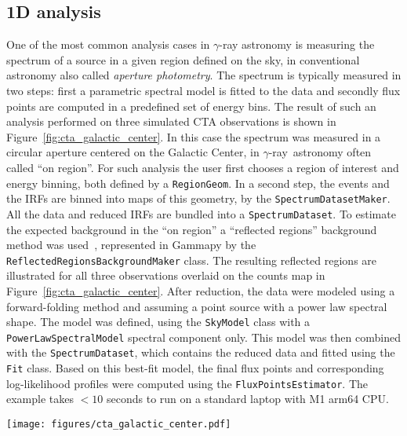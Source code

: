 \documentclass[longauth]{aa}
\newcommand{\code}[1]{\texttt{#1}}
\newcommand{\gammapy}{Gammapy\xspace}
\newcommand{\gammaray}{$\gamma$-ray\xspace}
\begin{document}
\subsection{1D analysis}
\label{ssec:1d-analysis}
One of the most common analysis cases in \gammaray astronomy is measuring the
spectrum of a source in a given region defined on the sky, in conventional
astronomy also called \emph{aperture photometry}. The spectrum is typically measured
in two steps: first a parametric spectral model is fitted to the data and
secondly flux points are computed in a predefined set of energy bins. The
result of such an analysis performed on three simulated CTA observations is
shown in Figure~\ref{fig:cta_galactic_center}. In this case the spectrum was
measured in a circular aperture centered on the Galactic Center, in
\gammaray~astronomy often called \enquote{on region}. For such analysis the user first
chooses a region of interest and energy binning, both defined by a
\code{RegionGeom}. In a second step, the events and the IRFs are binned
into maps of this geometry, by the \code{SpectrumDatasetMaker}. All the data and
reduced IRFs are bundled into a \code{SpectrumDataset}. To estimate
the expected background in the \enquote{on region} a \enquote{reflected regions} background
method was used~\citep{Berge07}, represented in \gammapy by the
\code{ReflectedRegionsBackgroundMaker} class. The resulting reflected regions are
illustrated for all three observations overlaid on the counts map in Figure~\ref{fig:cta_galactic_center}.
After reduction, the data were modeled using a forward-folding method and assuming
a point source with a power law spectral shape. The model was defined, using
the \code{SkyModel} class with a \code{PowerLawSpectralModel} spectral component only.
This model was then combined with the \code{SpectrumDataset}, which contains the reduced data 
and fitted using the \code{Fit} class. Based on this best-fit model, the final flux points and corresponding
log-likelihood profiles were computed using the \code{FluxPointsEstimator}. The
example takes $<10$ seconds to run on a standard laptop with M1 arm64 CPU.

\begin{figure*}
        \centering
        \texttt{[image: figures/cta\_galactic\_center.pdf]}
        \caption{
                Example of a 1D spectral analysis of the Galactic Center for three simulated
                observations from the first CTA data challenge. The left image shows the maps of counts with the signal
                region in white and the reflected background regions for the three different observations
                overlaid in different colors. The right image shows the resulting spectral flux points and
                their corresponding log-likelihood profiles. The flux points are shown in orange, with the
                horizontal bar illustrating the width of the energy bin and the vertical bar the $1~\sigma$
                error. The log-likelihood profiles for each enetgy bin are shown in the background. The colormap
                illustrates the difference of the log-likelihood to the log-likelihood of the best fit value.
                }
        \label{fig:cta_galactic_center}
\end{figure*}
\end{document}
